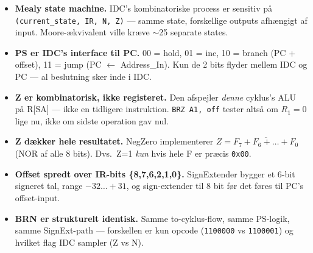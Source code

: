 \documentclass[11pt,a4paper]{article}
\begin{document}
\begin{itemize}
  \item \textbf{Mealy state machine.} IDC's kombinatoriske process er
        sensitiv på \texttt{(current\_state, IR, N, Z)} ---
        samme state, forskellige outputs afhængigt af input.
        Moore-ækvivalent ville kræve $\sim$25 separate states.

  \item \textbf{PS er IDC's interface til PC.}
        00 = hold, 01 = inc, 10 = branch (PC + offset),
        11 = jump (PC $\leftarrow$ Address\_In). Kun de 2 bits flyder
        mellem IDC og PC --- al beslutning sker inde i IDC.

  \item \textbf{Z er kombinatorisk, ikke registeret.}
        Den afspejler \emph{denne} cyklus's ALU på R[SA] ---
        ikke en tidligere instruktion. \texttt{BRZ A1, off}
        tester altså om \(R_1 = 0\) lige nu, ikke om sidste
        operation gav nul.

  \item \textbf{Z dækker hele resultatet.}
        NegZero implementerer \(Z = \overline{F_7 + F_6 + \ldots + F_0}\)
        (NOR af alle 8 bits). Dvs.\ Z=1 \emph{kun} hvis hele
        F er præcis \texttt{0x00}.

  \item \textbf{Offset spredt over IR-bits \{8,7,6,2,1,0\}.}
        SignExtender bygger et 6-bit signeret tal,
        range \(-32 \ldots +31\), og sign-extender til 8 bit
        før det føres til PC's offset-input.

  \item \textbf{BRN er strukturelt identisk.} Samme to-cyklus-flow,
        samme PS-logik, samme SignExt-path --- forskellen er kun
        opcode (\texttt{1100000} vs \texttt{1100001}) og hvilket flag
        IDC sampler (Z vs N).
\end{itemize}
\end{document}
